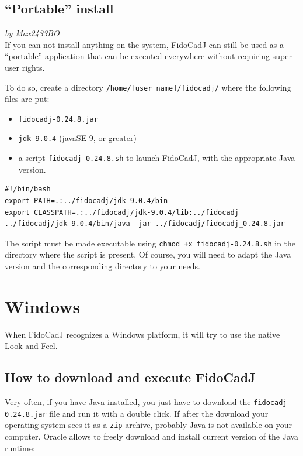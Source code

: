 \documentclass[10pt,a4paper,twoside]{scrreprt}
\begin{document}
\subsection{``Portable'' install}
 \textsl{by Max2433BO}\\
 
If you can not install anything on the system, FidoCadJ can still be used as a ``portable'' application that can be executed everywhere without requiring super user rights.

To do so, create a directory \lstinline!/home/[user_name]/fidocadj/! where the following files are put:


\begin{itemize}
\item \lstinline!fidocadj-0.24.8.jar!
\item \lstinline!jdk-9.0.4! (javaSE 9, or greater)
\item a script \lstinline!fidocadj-0.24.8.sh! to launch FidoCadJ, with the appropriate Java version.
\end{itemize}

\begin{lstlisting}
#!/bin/bash
export PATH=.:../fidocadj/jdk-9.0.4/bin
export CLASSPATH=.:../fidocadj/jdk-9.0.4/lib:../fidocadj
../fidocadj/jdk-9.0.4/bin/java -jar ../fidocadj/fidocadj_0.24.8.jar
\end{lstlisting}

The script must be made executable using \lstinline!chmod +x fidocadj-0.24.8.sh! in the directory where the script is present.
Of course, you will need to adapt the Java version and the corresponding directory to your needs.

\section{Windows}
When FidoCadJ recognizes a Windows platform, it will try to use the native Look and Feel.

 \subsection{How to download and execute FidoCadJ}
Very often, if you have Java installed, you just have to download the  \lstinline!fidocadj-0.24.8.jar! file and run it with a double click. If after the download your operating system sees it as a \lstinline!zip! archive, probably Java is not available on your computer. Oracle allows to freely download and install current version of the Java runtime:
\end{document}
